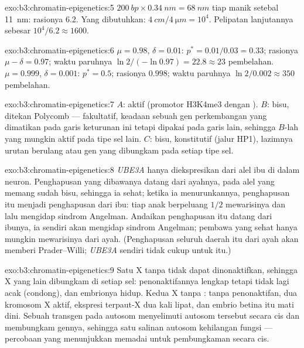\begin{solution}{exo:b3:chromatin-epigenetics:5}
$\qty{200}{bp}\times \qty{0.34}{nm} = \qty{68}{nm}$ tiap manik setebal
\qty{11}{nm}: rasionya $6.2$. Yang dibutuhkan: $\qty{4}{cm}/\qty{4}{\micro m} =
10^{4}$. Pelipatan lanjutannya sebesar $10^{4}/6.2 \approx 1600$.
\end{solution}

\begin{solution}{exo:b3:chromatin-epigenetics:6}
$\mu = 0.98$, $\delta = 0.01$: $p^{*} = 0.01/0.03 = 0.33$; rasionya $\mu -
\delta = 0.97$; waktu paruhnya $\ln 2/(-\ln 0.97) = 22.8 \approx 23$
pembelahan. $\mu = 0.999$, $\delta = 0.001$: $p^{*} = 0.5$; rasionya
$0.998$; waktu paruhnya $\ln 2 / 0.002 \approx 350$ pembelahan.
\end{solution}

\begin{solution}{exo:b3:chromatin-epigenetics:7}
$A$: aktif (promotor H3K4me3 dengan ). $B$: bisu, ditekan
Polycomb ---  fakultatif, keadaan sebuah gen perkembangan yang
dimatikan pada garis keturunan ini tetapi dipakai pada garis lain, sehingga
$B$-lah yang mungkin aktif pada tipe sel lain. $C$: bisu, 
konstitutif (jalur HP1), lazimnya urutan berulang atau gen yang dibungkam
pada setiap tipe sel.
\end{solution}

\begin{solution}{exo:b3:chromatin-epigenetics:8}
\emph{UBE3A} hanya diekspresikan dari alel ibu di dalam neuron. Penghapusan
yang dibawanya datang dari ayahnya, pada alel yang memang sudah bisu,
sehingga ia sehat; ketika ia menurunkannya, penghapusan itu menjadi
penghapusan dari ibu: tiap anak berpeluang $1/2$ mewarisinya dan lalu
mengidap sindrom Angelman. Andaikan penghapusan itu datang dari ibunya, ia
sendiri akan mengidap sindrom Angelman; pembawa yang sehat hanya mungkin
mewarisinya dari ayah. (Penghapusan seluruh daerah itu dari ayah akan memberi
Prader--Willi; \emph{UBE3A} sendiri tidak cukup untuk itu.)
\end{solution}

\begin{solution}{exo:b3:chromatin-epigenetics:9}
Satu X tanpa \emph{} tidak dapat dinonaktifkan, sehingga X yang lain
dibungkam di setiap sel: penonaktifannya lengkap tetapi tidak lagi acak
(condong), dan embrionya hidup. Kedua X tanpa \emph{}: tanpa
penonaktifan, dua kromosom X aktif, ekspresi terpaut-X dua kali lipat, dan
embrio betina itu mati dini. Sebuah transgen \emph{} pada autosom
menyelimuti autosom tersebut secara cis dan membungkam gennya, sehingga satu
salinan autosom kehilangan fungsi --- percobaan yang menunjukkan
\emph{} memadai untuk pembungkaman secara cis.
\end{solution}

